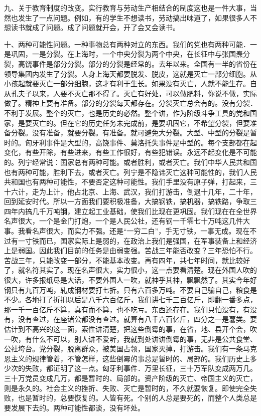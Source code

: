 九、关于教育制度的改变。实行教育与劳动生产相结合的制度这也是一件大事，当然也发生了一点问题。例如，有的学生不想读书，劳动搞出味道了，如果很多人不想读书就成了问题。成了问题就开会，开了会又会读书。

十、两种可能性问题。一种事物总有两种对立的东西。我们的党也有两种可能．一是巩固，一是分裂。在上海时，一个中央分裂为两个中央，在长征中与张国焘分裂，高饶事件是部分分裂。部分的分裂是经常的。去年以来。全国有一半的省份在领导集团内发生了分裂。人身上海天都要脱发、脱皮，这就是灭亡一部分细胞。从小孩起就要灭亡一部分细胞，这才有利于生长。如果没有灭亡，人就不能生存。自从孔夫子以来，人要不灭亡那不得了。灭亡有好处，可以做肥料，你说不做，实际做了。精神上要有准备。部分的分裂每天都存在。分裂灭亡总会有的。没有分裂．不利于发展。整个的灭亡，也是历史的必然。整个讲，作为阶级斗争工具的党和国家，是要灭亡的。但在它的历史任务未完成前，是要巩固它，不希望分裂，但要准备分裂。没有准备，就要分裂。有准备。就可避免大分裂。大型、中型的分裂是暂时的。匈牙利事件是大型的，高饶事件、莫洛托失事件是中型的。每个支部都在起变化，有些开除，有些进来，有些工作很好，有些犯错误。永远不起变化是不可能的。列宁经常说：国家总有两种可能。或者胜利，或者灭亡。我们中华人民共和国也有两种可能，胜利下去，或者灭亡。列宁是不隐讳灭亡这种可能性的，我们人民共和国也有两种可能性，不要否定这种可能性。我们手里没有原子弹，打起来，三十六计，走为上计，他占北京、上海、武汉，我们打游击，倒退十几年，二十年，回到延安时代。所以一方面我们要积极准备，大搞钢铁，搞机器，搞铁路，争取三四年内搞几千万吨钢，建立起工业基础，使我们比现在更巩固。我们现在在全世界名声很大，一个是金门打炮，一个是人民公社，还有钢一千零七十万吨这几件大事。我看名声很大，而实力不强。还是“一穷二白”，手无寸铁，一事无成。现在不过有一寸铁而已，国家实际上是弱的，在政治上我们是强国，在军事装备上和经济上是弱国。因此我们目前的任务是由弱变强。苦战三年能否改变？三年恐怕不行。苦战三年，只能改变一部分，不能基本改变。再有四年，共七年时间，就比较好了，就名符其实了。现在名声很大，实力很小，这一点要看清楚。现在外国人吹的很大，许多报纸尽是大话，不要外国人一吹，就神乎其神，飘飘然了。其实今年好钢只有九百万吨，轧成钢材要打七折。只有六百多万吨。不要自己骗自己，粮食是不少。各地打了折扣以后是八千六百亿斤，我们讲七千三百亿斤，即翻一番多点，那一千一百亿斤不算，真有而不算，也不吃亏。东西还存在。我们只怕没有，有没有，没有查过，在座诸公都没有查过。就算有八千六百亿斤，四分之一是薯类。要估计到不高兴的这一面，索性讲清楚，把这些倒霉的事，在省，地、县开个会，吹一吹，有什么不可以，别人讲不爱听，我就到处讲讲倒霉的事，无非是公共食堂、公社垮台。党分裂，脱离群众，被美国占领，国家灭掉，打游击。我们有一条马克恩主义的规律管着，不管怎样，这些倒霉的事总是暂时的、局部的。我们历史上多少次的失败，都证明了这一点。匈牙利事件．万里长征，三十万军队变成两万几。三十万党员变成几万，都是暂时的、局部的。资产阶级的灭亡、帝国主义的灭亡，则是永久的。社会主义的挫折、失败、灭亡是暂时的，不久就要恢复。即使完全失败，也是暂时的，总要恢复的。人皆有死。个别的人总是要死的，而整个人类总是要发展下去的。两种可能性都谈，没有坏处。

